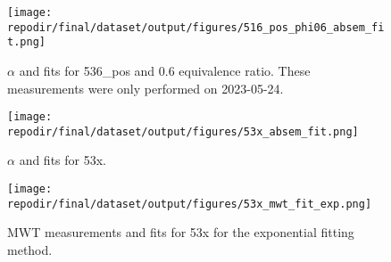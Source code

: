 \begin{figure}[]
\centering
\texttt{[image: \\repodir/final/dataset/output/figures/516\_pos\_phi06\_absem\_fit.png]}
\caption{$\alpha$ and fits for 536\_pos and 0.6 equivalence ratio. These measurements were only performed on 2023-05-24.}
\label{fig:SI_536_pos_phi06_absem_fit}
\end{figure}

\begin{figure}[]
\centering
\texttt{[image: \\repodir/final/dataset/output/figures/53x\_absem\_fit.png]}
\caption{$\alpha$ and fits for 53x.}
\label{fig:SI_53x_absem_fit}
\end{figure}


\begin{figure}[]
\centering
\texttt{[image: \\repodir/final/dataset/output/figures/53x\_mwt\_fit\_exp.png]}
\caption{MWT measurements and fits for 53x for the exponential fitting method. }
\label{fig:SI_53x_mwt_fit_exp}
\end{figure}
